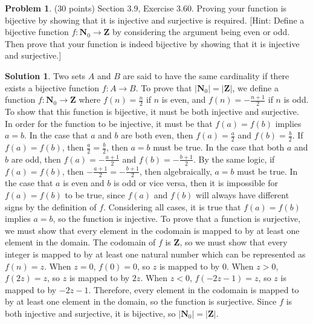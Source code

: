 \documentclass{article}
\theoremstyle{definition}
\newtheorem{problem}{Problem}
\newtheorem*{solution}{Solution}
\newcommand{\N}{\mathbf{N}}
\newcommand{\Z}{\mathbf{Z}}
\begin{document}
\newpage
\begin{problem} (30 points) Section 3.9, Exercise 3.60. Proving your function 
is bijective by showing that it is injective and surjective is required.
[Hint: Define a bijective function $f\colon \N_0\rightarrow \Z$ by
considering the argument being even or odd. Then prove that your 
function is indeed bijective by showing that it is injective and surjective.]
\end{problem}
\begin{solution} 
Two sets $A$ and $B$ are said to have the same cardinality if there exists a bijective function $f\colon A\rightarrow B$.
To prove that $|\N_0| = |\Z|$, we define a function $f\colon \N_0\rightarrow \Z$ where $f(n) = \frac{n}{2}$ if $n$ is even, and $f(n) = -\frac{n+1}{2}$ if $n$ is odd.
To show that this function is bijective, it must be both injective and surjective.
In order for the function to be injective, it must be that $f(a) = f(b)$ implies $a = b$.
In the case that $a$ and $b$ are both even, then $f(a) = \frac{a}{2}$ and $f(b) = \frac{b}{2}$.
If $f(a) = f(b)$, then $\frac{a}{2} = \frac{b}{2}$, then $a = b$ must be true.
In the case that both $a$ and $b$ are odd, then $f(a) = -\frac{a+1}{2}$ and $f(b) = -\frac{b+1}{2}$.
By the same logic, if $f(a) = f(b)$, then $-\frac{a+1}{2} = -\frac{b+1}{2}$, then algebraically, $a = b$ must be true.
In the case that $a$ is even and $b$ is odd or vice versa, then it is impossible for $f(a) = f(b)$ to be true, since $f(a)$ and $f(b)$ will always have different signs by the definition of $f$.
Considering all cases, it is true that $f(a) = f(b)$ implies $a = b$, so the function is injective.
To prove that a function is surjective, we must show that every element in the codomain is mapped to by at least one element in the domain.
The codomain of $f$ is $\Z$, so we must show that every integer is mapped to by at least one natural number which can be represented as $f(n) = z$.
When $z = 0$, $f(0) = 0$, so $z$ is mapped to by $0$.
When $z > 0$, $f(2z) = z$, so $z$ is mapped to by $2z$.
When $z < 0$, $f(-2z-1) = z$, so $z$ is mapped to by $-2z-1$.
Therefore, every element in the codomain is mapped to by at least one element in the domain, so the function is surjective.
Since $f$ is both injective and surjective, it is bijective, so $|\N_0| = |\Z|$.
\end{solution}
\end{document}
